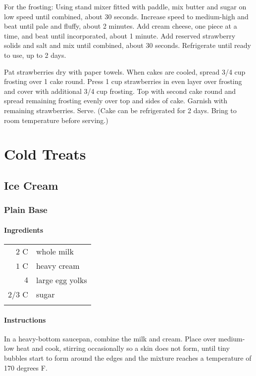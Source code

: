 \documentclass[12pt,landscape,twoside,twocolumn, openright, titlepage, draft]{book}
\begin{document}
For the frosting: Using stand mixer fitted with paddle, mix butter and
sugar on low speed until combined, about 30 seconds. Increase speed to
medium-high and beat until pale and fluffy, about 2 minutes. Add cream
cheese, one piece at a time, and beat until incorporated, about 1
minute. Add reserved strawberry solids and salt and mix until
combined, about 30 seconds. Refrigerate until ready to use, up to 2
days.

Pat strawberries dry with paper towels. When cakes are cooled, spread
3/4 cup frosting over 1 cake round. Press 1 cup strawberries in even
layer over frosting and cover with additional 3/4 cup frosting. Top
with second cake round and spread remaining frosting evenly over top
and sides of cake. Garnish with remaining strawberries. Serve. (Cake
can be refrigerated for 2 days. Bring to room temperature before
serving.)

\chapter{Cold Treats}
\section{Ice Cream}

\subsection{Plain Base}
\subsubsection{Ingredients}
\begin{tabular}{r p{1.5in}}
$2$   C & whole milk            \\ 
$1$   C & heavy cream           \\ 
$4$     & large egg yolks       \\
$2/3$ C & sugar                 \\ \\
\end{tabular}
\subsubsection{Instructions}
In a heavy-bottom saucepan, combine the milk and cream. Place over medium-low heat and cook, stirring occasionally so a skin does not form, until tiny bubbles start to form around the edges and the mixture reaches a temperature of 170 degrees F.
\end{document}
